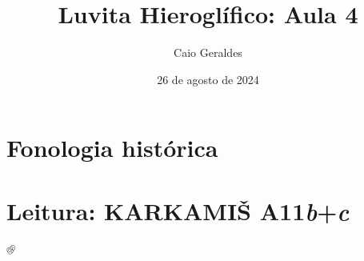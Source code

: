 \documentclass[article]{luvita}
\title{Luvita Hieroglífico: Aula 4}
\author{Caio Geraldes}
\date{26 de agosto de 2024}
\begin{document}
\frontmatter

\mainmatter%

\maketitle


\chapter{Fonologia histórica}


\chapter{Leitura: KARKAMIŠ A11\emph{b}+\emph{c}}



\backmatter%

\printbibliography%

𔐀
\end{document}

